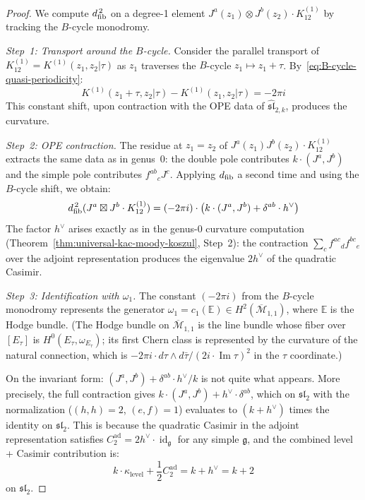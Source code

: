 \begin{proof}
We compute $d_{\mathrm{fib}}^{\,2}$ on a degree-1 element $J^a(z_1) \otimes J^b(z_2) \cdot K^{(1)}_{12}$ by tracking the $B$-cycle monodromy.

\emph{Step~1: Transport around the $B$-cycle.}
Consider the parallel transport of $K^{(1)}_{12} = K^{(1)}(z_1,z_2|\tau)$ as $z_1$ traverses the $B$-cycle $z_1 \mapsto z_1 + \tau$.  By~\eqref{eq:B-cycle-quasi-periodicity}:
\begin{equation}
K^{(1)}(z_1+\tau,z_2|\tau) - K^{(1)}(z_1,z_2|\tau) = -2\pi i
\end{equation}
This constant shift, upon contraction with the OPE data of $\widehat{\mathfrak{sl}}_{2,k}$, produces the curvature.

\emph{Step~2: OPE contraction.}
The residue at $z_1 = z_2$ of $J^a(z_1) J^b(z_2) \cdot K^{(1)}_{12}$ extracts the same data as in genus~0: the double pole contributes $k \cdot (J^a, J^b)$ and the simple pole contributes $f^{ab}{}_c J^c$.  Applying $d_{\mathrm{fib}}$ a second time and using the $B$-cycle shift, we obtain:
\begin{equation}
d_{\mathrm{fib}}^{\,2}(J^a \boxtimes J^b \cdot K^{(1)}_{12}) = (-2\pi i) \cdot \bigl(k \cdot (J^a, J^b) + \delta^{ab} \cdot h^\vee\bigr)
\end{equation}
The factor $h^\vee$ arises exactly as in the genus-0 curvature computation (Theorem~\ref{thm:universal-kac-moody-koszul}, Step~2): the contraction $\sum_c f^{ac}{}_d f^{bc}{}_e$ over the adjoint representation produces the eigenvalue $2h^\vee$ of the quadratic Casimir.

\emph{Step~3: Identification with $\omega_1$.}
The constant $(-2\pi i)$ from the $B$-cycle monodromy represents the generator $\omega_1 = c_1(\mathbb{E}) \in H^2(\overline{\mathcal{M}}_{1,1})$, where $\mathbb{E}$ is the Hodge bundle.  (The Hodge bundle on $\overline{\mathcal{M}}_{1,1}$ is the line bundle whose fiber over $[E_\tau]$ is $H^0(E_\tau, \omega_{E_\tau})$; its first Chern class is represented by the curvature of the natural connection, which is $-2\pi i \cdot d\tau \wedge d\bar{\tau}/(2i \cdot \operatorname{Im}\tau)^2$ in the $\tau$ coordinate.)

On the invariant form: $(J^a, J^b) + \delta^{ab} \cdot h^\vee/k$ is not quite what appears.  More precisely, the full contraction gives $k \cdot (J^a, J^b) + h^\vee \cdot \delta^{ab}$, which on $\mathfrak{sl}_2$ with the normalization ($(h,h) = 2$, $(e,f)=1$) evaluates to $(k+h^\vee)$ times the identity on $\mathfrak{sl}_2$.  This is because the quadratic Casimir in the adjoint representation satisfies $C_2^{\mathrm{ad}} = 2h^\vee \cdot \operatorname{id}_{\mathfrak{g}}$ for any simple $\mathfrak{g}$, and the combined level + Casimir contribution is:
\begin{equation}
k \cdot \kappa_{\mathrm{level}} + \frac{1}{2}C_2^{\mathrm{ad}} = k + h^\vee = k + 2
\end{equation}
on $\mathfrak{sl}_2$.


\end{proof}
